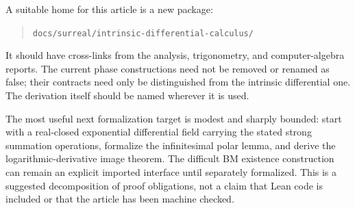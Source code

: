 \documentclass[11pt]{article}
\numberwithin{equation}{section}
\theoremstyle{definition}
\newcommand{\pathtext}[1]{\nolinkurl{#1}}
\begin{document}
A suitable home for this article is a new package:
\begin{quote}\pathtext{docs/surreal/intrinsic-differential-calculus/}\end{quote}
It should have cross-links
from the analysis, trigonometry, and computer-algebra reports. The current
phase constructions need not be removed or renamed as false; their
contracts need only be distinguished from the intrinsic differential one.
The derivation itself should be named wherever it is used.

The most useful next formalization target is modest and sharply bounded:
start with a real-closed exponential differential field carrying the
stated strong summation operations, formalize the infinitesimal polar
lemma, and derive the logarithmic-derivative image theorem. The difficult
BM existence construction can remain an explicit imported interface
until separately formalized. This is a suggested decomposition of proof
obligations, not a claim that Lean code is included or that the article
has been machine checked.

\appendix
\end{document}
